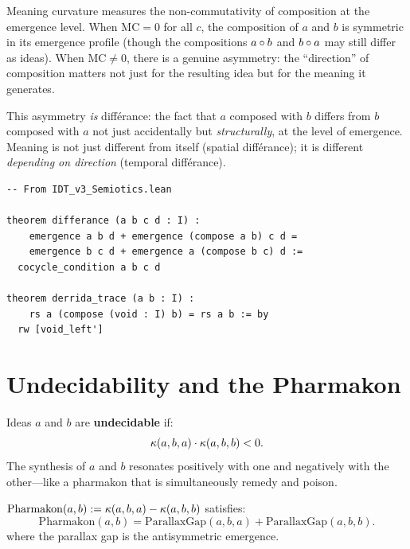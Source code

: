 \begin{remark}
Meaning curvature measures the non-commutativity of composition at the
emergence level. When $\mathrm{MC} = 0$ for all $c$, the composition of $a$
and $b$ is symmetric in its emergence profile (though the compositions
$a \circ b$ and $b \circ a$ may still differ as ideas). When
$\mathrm{MC} \neq 0$, there is a genuine asymmetry: the ``direction'' of
composition matters not just for the resulting idea but for the meaning
it generates.

This asymmetry \emph{is} diff\'erance: the fact that $a$ composed with $b$
differs from $b$ composed with $a$ not just accidentally but \emph{structurally},
at the level of emergence. Meaning is not just different from itself (spatial
diff\'erance); it is different \emph{depending on direction} (temporal
diff\'erance).
\end{remark}

\begin{lstlisting}
-- From IDT_v3_Semiotics.lean

theorem differance (a b c d : I) :
    emergence a b d + emergence (compose a b) c d =
    emergence b c d + emergence a (compose b c) d :=
  cocycle_condition a b c d

theorem derrida_trace (a b : I) :
    rs a (compose (void : I) b) = rs a b := by
  rw [void_left']
\end{lstlisting}

\section{Undecidability and the Pharmakon}

\begin{definition}[Undecidable]
\label{def:undecidable}
Ideas $a$ and $b$ are \textbf{undecidable} if:
\[
\kappa(a, b, a) \cdot \kappa(a, b, b) < 0.
\]
The synthesis of $a$ and $b$ resonates positively with one and negatively
with the other---like a pharmakon that is simultaneously remedy and poison.
\end{definition}

\begin{theorem}
\label{thm:pharmakon-parallax}
$\mathrm{Pharmakon}(a, b) := \kappa(a, b, a) - \kappa(a, b, b)$ satisfies:
\[
\mathrm{Pharmakon}(a, b) = \mathrm{ParallaxGap}(a, b, a) + \mathrm{ParallaxGap}(a, b, b).
\]
where the parallax gap is the antisymmetric emergence.
\end{theorem}

